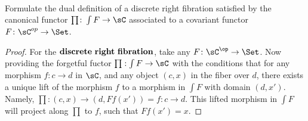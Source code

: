 \documentclass[main.tex]{subfiles}
\begin{document}
	
\paragraph{}
\begin{exercise}
Formulate the dual definition of a discrete right fibration satisfied by the
canonical functor $\prod \colon \int F \rightarrow \sC$ associated to a covariant
functor $F \colon \sC^{op} \rightarrow \Set$.
\end{exercise}

\begin{proof}
For the $\bold{discrete \ right \ fibration}$, take any $F\colon\sC^{\op}\rightarrow
\Set$. Now providing the forgetful fuctor $\prod : \int F \rightarrow\sC$
with the conditions that for any morphism $f\colon c \rightarrow d$ in $\sC$, and any
object $(c, x)$ in the fiber over $d$, there exists a unique lift of the
morphism $f$ to a morphism in $\int F$ with domain $(d,x')$. Namely, $\prod \colon(c,x) \rightarrow (d, Ff(x')) = f\colon c \rightarrow d$. This lifted morphism in
$\int F$ will project along $\prod$ to $f$, such that $Ff(x') = x$. 

\end{proof}	
\end{document}
